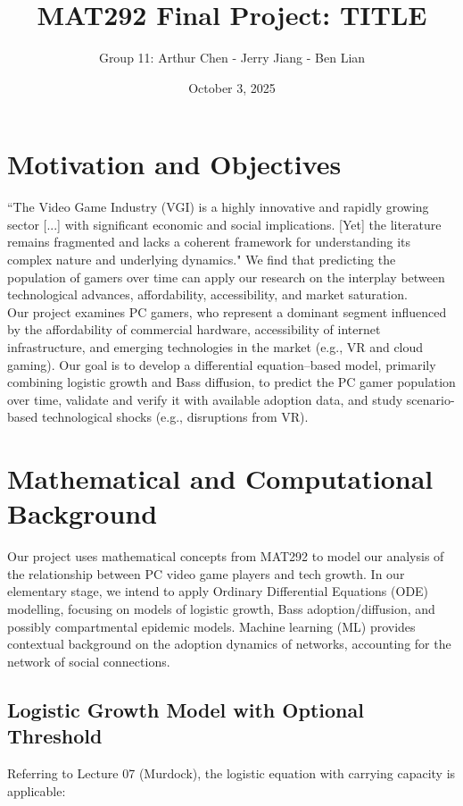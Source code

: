 \documentclass{article}
\title{\vspace{-2cm}MAT292 Final Project: TITLE}
\author{Group 11: Arthur Chen - Jerry Jiang - Ben Lian}
\date{October 3, 2025}
\begin{document}
\maketitle

\section{Motivation and Objectives}
``The Video Game Industry (VGI) is a highly innovative and rapidly growing sector [...] with significant economic and social implications. [Yet] the literature remains fragmented and lacks a coherent framework for understanding its complex nature and underlying dynamics." \cite{GOH2023100100} We find that predicting the population of gamers over time can apply our research on the interplay between technological advances, affordability, accessibility, and market saturation.\\

\noindent 
Our project examines PC gamers, who represent a dominant segment influenced by the affordability of commercial hardware, accessibility of internet infrastructure, and emerging technologies in the market (e.g., VR and cloud gaming). Our goal is to develop a differential equation–based model, primarily combining logistic growth and Bass diffusion, to predict the PC gamer population over time, validate and verify it with available adoption data, and study scenario-based technological shocks (e.g., disruptions from VR).

\section{Mathematical and Computational Background}
Our project uses mathematical concepts from MAT292 to model our analysis of the relationship between PC video game players and tech growth. In our elementary stage, we intend to apply Ordinary Differential Equations (ODE) modelling, focusing on models of logistic growth, Bass adoption/diffusion, and possibly compartmental epidemic models. Machine learning (ML) provides contextual background on the adoption dynamics of networks, accounting for the network of social connections. 

\subsection{Logistic Growth Model with Optional Threshold}
Referring to Lecture 07 (Murdock), the logistic equation with carrying capacity is applicable: 
\end{document}
